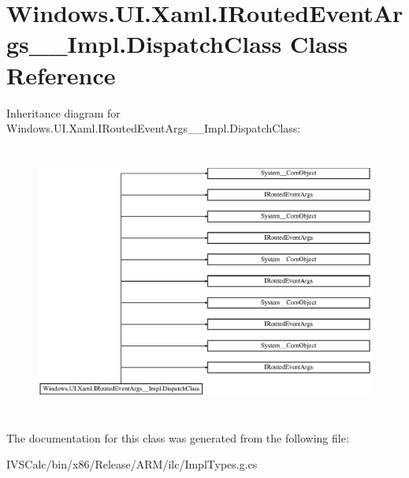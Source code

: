 \hypertarget{class_windows_1_1_u_i_1_1_xaml_1_1_i_routed_event_args_____impl_1_1_dispatch_class}{}\section{Windows.\+U\+I.\+Xaml.\+I\+Routed\+Event\+Args\+\_\+\+\_\+\+Impl.\+Dispatch\+Class Class Reference}
\label{class_windows_1_1_u_i_1_1_xaml_1_1_i_routed_event_args_____impl_1_1_dispatch_class}
Inheritance diagram for Windows.\+U\+I.\+Xaml.\+I\+Routed\+Event\+Args\+\_\+\+\_\+\+Impl.\+Dispatch\+Class\+:\begin{figure}[H]
\begin{center}
\leavevmode
\includegraphics[height=9.005848cm]{class_windows_1_1_u_i_1_1_xaml_1_1_i_routed_event_args_____impl_1_1_dispatch_class}
\end{center}
\end{figure}


The documentation for this class was generated from the following file\+:\begin{DoxyCompactItemize}
\item 
I\+V\+S\+Calc/bin/x86/\+Release/\+A\+R\+M/ilc/Impl\+Types.\+g.\+cs\end{DoxyCompactItemize}
